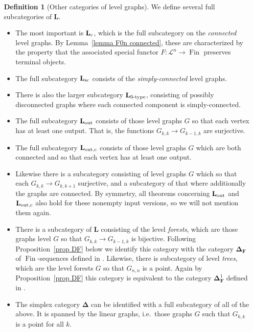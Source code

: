 \documentclass{amsart}
\numberwithin{theorem}{subsection}
\theoremstyle{definition}
\newtheorem{definition}[theorem]{Definition}
\newcommand{\finset}{\operatorname{Fin}}
\newcommand{\finsetskel}{\mathbf{F}}
\newcommand{\name}[1]{\ensuremath{\text{\textup{#1}}}}
\newcommand{\simp}{\mathbf{\Delta}}
\newcommand{\levelg}{\mathbf{L}}
\newcommand{\levelgconn}{\levelg_{\name{c}}}
\newcommand{\scriptyell}{\mathscr L}
\begin{document}
\begin{definition}[Other categories of level graphs]
\label{def subcategories of levelg}
We define several full subcategories of $\levelg$.
\begin{itemize}
\item The most important is $\levelgconn$, which is the full subcategory on the \emph{connected} level graphs.
By Lemma~\ref{lemma F0n connected}, these are characterized by the property that the associated special functor $F \colon \scriptyell^n \to \finset$ preserves terminal objects.
\item The full subcategory $\levelg_{\name{sc}}$ consists of the \emph{simply-connected} level graphs.
\item There is also the larger subcategory $\levelg_{\name{0-type}}$, consisting of possibly disconnected graphs where each connected component is simply-connected.
\item The full subcategory $\levelg_{\name{out}}$ consists of those level graphs $G$ so that each vertex has at least one output. That is, the functions $G_{k,k} \to G_{k-1,k}$ are surjective.
\item The full subcategory $\levelg_{\name{out,c}}$ consists of those level graphs $G$ which are both connected and so that each vertex has at least one output.
\item Likewise there is a subcategory consisting of level graphs $G$ which so that each $G_{k,k} \to G_{k,k+1}$ surjective, and a subcategory of that where additionally the graphs are connected.
By symmetry, all theorems concerning $\levelg_{\name{out}}$ and $\levelg_{\name{out,c}}$ also hold for these nonempty input versions, so we will not mention them again.
\item There is a subcategory of $\levelg$ consisting of the level \emph{forests}, which are those graphs level $G$ so that $G_{k,k} \to G_{k-1,k}$ is bijective.
Following Proposition~\ref{prop DF} below we identify this category with the category $\simp_\finsetskel$ of $\finset$-sequences defined in \cite{bar}. 
Likewise, there is subcategory of level \emph{trees}, which are the level forests $G$ so that $G_{n,n}$ is a point. 
Again by Proposition~\ref{prop DF} this category is equivalent to the category $\simp^1_\finsetskel$ defined in \cite{ChuHaugsengHeuts}.
\item The simplex category $\simp$ can be identified with a full subcategory of all of the above.
It is spanned by the linear graphs, i.e.\ those graphs $G$ such that $G_{k,k}$ is a point for all $k$.
\end{itemize}
\end{definition}
\end{document}
